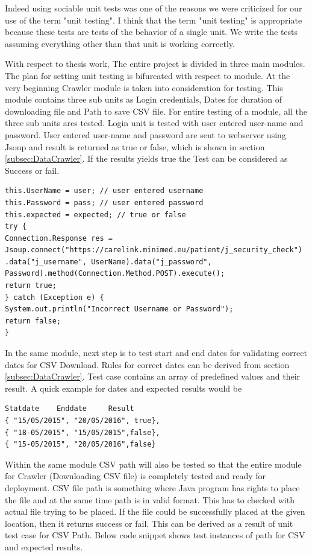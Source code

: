 \documentclass[article,type=msc,colorback,accentcolor=tud9c,twoside,11pt]{tudthesis}
\begin{document}
Indeed using sociable unit tests was one of the reasons we were criticized for our use of the term "unit testing". I think that the term "unit testing" is appropriate because these tests are tests of the behavior of a single unit. We write the tests assuming everything other than that unit is working correctly.

With respect to thesis work, The entire project is divided in three main modules. The plan for setting unit testing is bifurcated with respect to module. At the very beginning Crawler module is taken into consideration for testing. This module contains three sub units as Login credentials, Dates for duration of downloading file and Path to save CSV file. For entire testing of a module, all the three sub units ares tested. Login unit is tested with user entered user-name and password. User entered user-name and password are sent to webserver using Jsoup and result is returned as true or false, which is shown in section \ref{subsec:DataCrawler}. If the results yields  true the Test can be considered as Success or fail.
\begin{lstlisting}
this.UserName = user; // user entered username
this.Password = pass; // user entered password
this.expected = expected; // true or false
try {
Connection.Response res = Jsoup.connect("https://carelink.minimed.eu/patient/j_security_check")
.data("j_username", UserName).data("j_password", Password).method(Connection.Method.POST).execute();
return true;
} catch (Exception e) {
System.out.println("Incorrect Username or Password");
return false;
}
\end{lstlisting}
 In the same module, next step is to test start and end dates for validating correct dates for CSV Download. Rules for correct dates can be derived from section \ref{subsec:DataCrawler}. Test case contains an array of predefined values and their result. A quick example for dates and expected results would be
 \clearpage
\begin{lstlisting}
Statdate 	Enddate 	Result
{ "15/05/2015", "20/05/2016", true},
{ "18-05/2015", "15/05/2015",false},
{ "15-05/2015", "20/05/2016",false}
\end{lstlisting}
 Within the same module CSV path will also be tested so that the entire module for Crawler (Downloading CSV file) is completely tested and ready for deployment. CSV file path is something where Java program has rights to place the file and at the same time path is in valid format. This has to checked with actual file trying to be placed. If the file could be successfully placed at the given location, then it returns success or fail. This can be derived as a result of unit test case for CSV Path. Below code snippet shows test instances of path for CSV and expected results.
\end{document}
